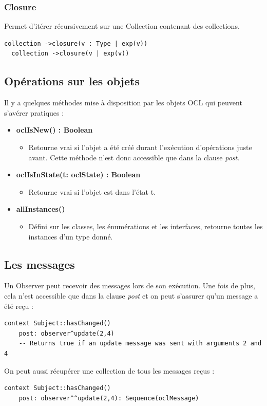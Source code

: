 \documentclass[../Syllabus.tex]{subfiles}
\begin{document}
\subsubsection{Closure}

Permet d'itérer récursivement sur une Collection contenant des collections.

\begin{lstlisting}[language=OCL]
  collection ->closure(v : Type | exp(v))
  collection ->closure(v | exp(v))
\end{lstlisting}

\subsection{Opérations sur les objets}

Il y a quelques méthodes mise à disposition par les objets OCL qui peuvent s'avérer pratiques :

\begin{itemize}
  \item \textbf{oclIsNew() : Boolean}
  \begin{itemize}
    \item Retourne vrai si l'objet a été créé durant l'exécution d'opérations juste avant. Cette méthode n'est donc accessible que dans la clause \textit{post}.
  \end{itemize}
  \item \textbf{oclIsInState(t: oclState) : Boolean}
  \begin{itemize}
    \item Retourne vrai si l'objet est dans l'état t.
  \end{itemize}
  \item \textbf{allInstances()}
  \begin{itemize}
    \item Défini sur les classes, les énumérations et les interfaces, retourne toutes les instances d'un type donné.
  \end{itemize}
\end{itemize}

\subsection{Les messages}

Un Observer peut recevoir des messages lors de son exécution. Une fois de plus, cela n'est accessible que dans la clause \textit{post} et on peut s'assurer qu'un message a été reçu :

\begin{lstlisting}[language=OCL]
  context Subject::hasChanged()
    post: observer^update(2,4)
    -- Returns true if an update message was sent with arguments 2 and 4
\end{lstlisting}

On peut aussi récupérer une collection de tous les messages reçus :

\begin{lstlisting}[language=OCL]
  context Subject::hasChanged()
    post: observer^^update(2,4): Sequence(oclMessage)
\end{lstlisting}
\end{document}
